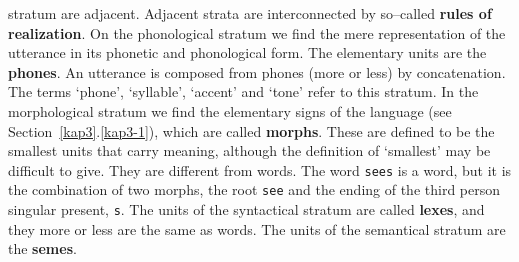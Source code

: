 stratum are adjacent. Adjacent
strata are interconnected by so--called \textbf{rules of realization}.
On the phonological stratum we find the mere representation
of the utterance in its phonetic and phonological form. The
elementary units are the \textbf{phones}. An utterance is composed
from phones (more or less) by concatenation.
The terms `phone', `syllable', `accent' and `tone' refer to this stratum. 
In the morphological stratum we find the elementary signs 
of the language (see Section~\ref{kap3}.\ref{kap3-1}),
which are called \textbf{morphs}. These are defined to be the smallest
units that carry meaning, although the definition of `smallest'
may be difficult to give. They are different from words.
The word {\tt sees} is a word, but it is the combination
of two morphs, the root {\tt see} and the ending of the third
person singular present, {\tt s}. The units of the syntactical
stratum
are called \textbf{lexes}, and they more or less are the same as words. 
The units of the semantical stratum are the \textbf{semes}.

